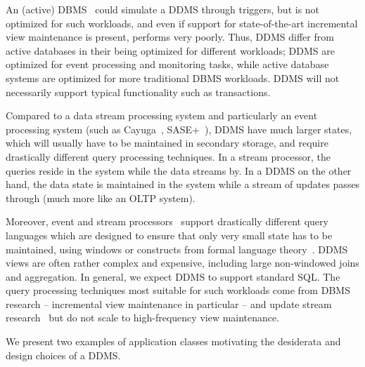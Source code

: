 An (active) DBMS~\cite{ceri-vldb:00} could simulate a DDMS through triggers, but
is not optimized for such workloads, and even if support for state-of-the-art
incremental view maintenance is present, performs very poorly. Thus, DDMS differ
from active databases in their being optimized for different workloads; DDMS are
optimized for event processing and monitoring tasks, while active database
systems are optimized for more traditional DBMS workloads. DDMS will not
necessarily support typical functionality such as transactions.



Compared to a data stream processing system and particularly an event processing
system (such as Cayuga~\cite{demers-sigmod:07}, SASE+~\cite{agrawal-sigmod:08}),
DDMS have much larger states, which will usually have to be maintained in
secondary storage, and require drastically different query processing
techniques. In a stream processor, the queries reside in the system while the
data streams by. In a DDMS on the other hand, the data state is maintained in
the system while a stream of updates passes through (much more like an OLTP
system).

%
Moreover, event and stream processors~\cite{abadi-vldbj:03, motwani-cidr:03,
chandrasekaran-cidr:03} support drastically different query languages which are
designed to ensure that only very small state has to be maintained, using
windows or constructs from formal language theory~\cite{white-pods:07}. DDMS
views are often rather complex and expensive, including large non-windowed joins
and aggregation. In general, we expect DDMS to support standard SQL.
The query processing techniques most suitable for such workloads come from DBMS
research -- incremental view maintenance in particular -- and update stream
research~\cite{ghanem-tods:10} but do not scale to high-frequency view
maintenance.



\medskip

We present two examples of application classes motivating the desiderata and
design choices of a DDMS.

